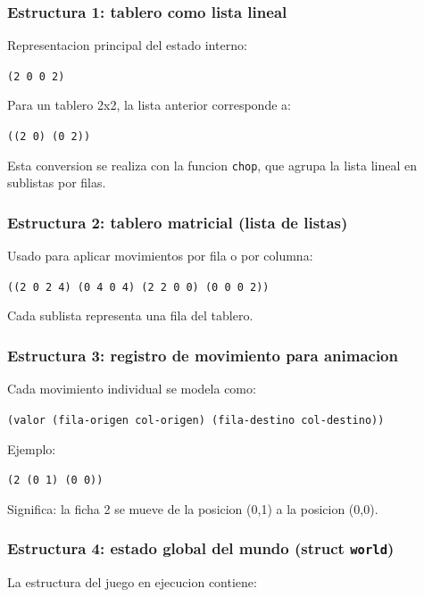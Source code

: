 \documentclass[12pt,a4paper]{article}
\begin{document}
\subsubsection*{Estructura 1: tablero como lista lineal}
Representacion principal del estado interno:

\begin{center}
\texttt{(2 0 0 2)}
\end{center}

Para un tablero 2x2, la lista anterior corresponde a:

\begin{center}
\texttt{((2 0) (0 2))}
\end{center}

Esta conversion se realiza con la funcion \texttt{chop}, que agrupa la lista lineal en sublistas por filas.

\subsubsection*{Estructura 2: tablero matricial (lista de listas)}
Usado para aplicar movimientos por fila o por columna:

\begin{center}
\texttt{((2 0 2 4) (0 4 0 4) (2 2 0 0) (0 0 0 2))}
\end{center}

Cada sublista representa una fila del tablero.

\subsubsection*{Estructura 3: registro de movimiento para animacion}
Cada movimiento individual se modela como:

\begin{center}
\texttt{(valor (fila-origen col-origen) (fila-destino col-destino))}
\end{center}

Ejemplo:

\begin{center}
\texttt{(2 (0 1) (0 0))}
\end{center}

Significa: la ficha 2 se mueve de la posicion (0,1) a la posicion (0,0).

\subsubsection*{Estructura 4: estado global del mundo (struct \texttt{world})}
La estructura del juego en ejecucion contiene:
\end{document}
